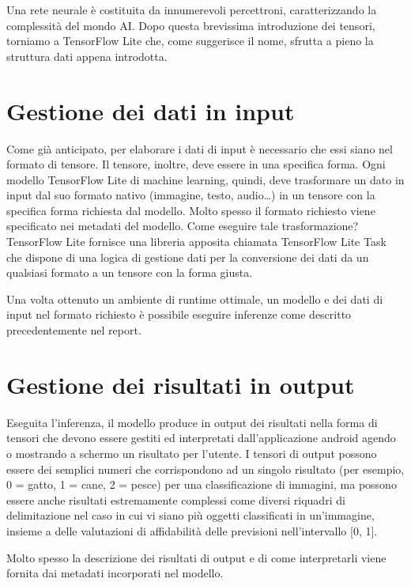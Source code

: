 Una rete neurale è costituita da innumerevoli percettroni, caratterizzando la complessità del mondo AI. Dopo questa brevissima introduzione dei tensori, torniamo a TensorFlow Lite che, come suggerisce il nome, sfrutta a pieno
la struttura dati appena introdotta.

\newpage
\section{Gestione dei dati in input}
Come già anticipato, per elaborare i dati di input è necessario che essi siano nel formato di tensore. Il tensore, inoltre, deve essere in una specifica forma. Ogni modello TensorFlow Lite di machine learning, quindi, deve trasformare
un dato in input dal suo formato nativo (immagine, testo, audio…) in un tensore con la specifica forma richiesta dal modello. Molto spesso il formato richiesto viene specificato nei metadati del modello. Come eseguire tale trasformazione?
TensorFlow Lite fornisce una libreria apposita chiamata TensorFlow Lite Task che dispone di una logica di gestione dati per la conversione dei dati da un qualsiasi formato a un tensore con la forma giusta.

Una volta ottenuto un ambiente di runtime ottimale, un modello e dei dati di input nel formato richiesto è possibile eseguire inferenze come descritto precedentemente nel report.

\section{Gestione dei risultati in output}
Eseguita l’inferenza, il modello produce in output dei risultati nella forma di tensori che devono essere gestiti ed interpretati dall’applicazione android agendo o mostrando a schermo un risultato per l’utente. 
I tensori di output possono essere dei semplici numeri che corrispondono ad un singolo risultato (per esempio, 0 = gatto, 1 = cane, 2 = pesce) per una classificazione di immagini, ma possono essere anche risultati estremamente
complessi come diversi riquadri di delimitazione nel caso in cui vi siano più oggetti classificati in un’immagine, insieme a delle valutazioni di affidabilità delle previsioni nell’intervallo [0, 1].

Molto spesso la descrizione dei risultati di output e di come interpretarli viene fornita dai metadati incorporati nel modello.

